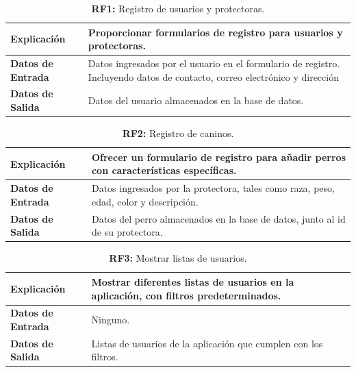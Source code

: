 \documentclass[a4paper, 12pt]{article}
\begin{document}
\begin{table}[H]
\captionsetup{justification=raggedright,singlelinecheck=false}
\caption{\textbf{RF1:} Registro de usuarios y protectoras.}
\label{tab:RF1}
	\begin{tabular}{|m{5cm}|m{10cm}|}
	\hline
	\textbf{Explicación} & Proporcionar formularios de registro para usuarios y protectoras. \\ 
	\hline
	\textbf{Datos de Entrada} & Datos ingresados por el usuario en el formulario de registro. Incluyendo datos de contacto, correo electrónico y dirección \\ 
	\hline
	\textbf{Datos de Salida} & Datos del usuario almacenados en la base de datos. \\ 
	\hline
\end{tabular}
\end{table}

\begin{table}[H]
\captionsetup{justification=raggedright,singlelinecheck=false}
\caption{\textbf{RF2:} Registro de caninos.}
\label{tab:RF2}
	\begin{tabular}{|m{5cm}|m{10cm}|}
	\hline
	\textbf{Explicación} & Ofrecer un formulario de registro para añadir perros con características específicas. \\ 
	\hline
	\textbf{Datos de Entrada} & Datos ingresados por la protectora, tales como raza, peso, edad, color y descripción. \\ 
	\hline
	\textbf{Datos de Salida} & Datos del perro almacenados en la base de datos, junto al id de su protectora. \\ 
	\hline
\end{tabular}
\end{table}

\begin{table}[H]
\captionsetup{justification=raggedright,singlelinecheck=false}
\caption{\textbf{RF3:} Mostrar listas de usuarios.}
\label{tab:RF23}
	\begin{tabular}{|m{5cm}|m{10cm}|}
	\hline
	\textbf{Explicación} & Mostrar diferentes listas de usuarios en la aplicación, con filtros predeterminados. \\ 
	\hline
	\textbf{Datos de Entrada} & Ninguno. \\ 
	\hline
	\textbf{Datos de Salida} & Listas de usuarios de la aplicación que cumplen con los filtros.  \\ 
	\hline
\end{tabular}
\end{table}
\end{document}
